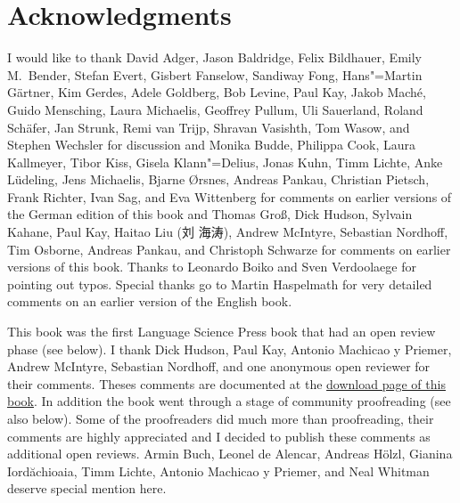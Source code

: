 \section*{Acknowledgments}

I would like to thank David Adger,
Jason Baldridge, 
Felix Bildhauer, 
Emily M.\ Bender,
Stefan Evert, 
Gisbert Fanselow, 
Sandiway Fong,
Hans"=Martin Gärtner,
Kim Gerdes,
Adele Goldberg,
Bob Levine,
Paul Kay,
Jakob Maché,
Guido Mensching,
Laura Michaelis,
Geoffrey Pullum, 
Uli Sauerland, 
Roland Schäfer,
Jan Strunk,
Remi van Trijp, 
Shravan Vasishth,
Tom Wasow, and
Stephen Wechsler
for discussion and 
%
Monika Budde, 
Philippa Cook,
Laura Kallmeyer, 
Tibor Kiss,
Gisela Klann"=Delius, 
Jonas Kuhn,
Timm Lichte, %
Anke Lüdeling,
Jens Michaelis,
Bjarne Ørsnes,
Andreas Pankau,     %
Christian Pietsch,
Frank Richter,
Ivan Sag, and
Eva Wittenberg
for comments on earlier versions of the German edition of this book and
%
%
Thomas Groß,
Dick Hudson,
Sylvain Kahane, 
Paul Kay,
Haitao Liu (刘 海涛),
Andrew McIntyre,
Sebastian Nordhoff,
Tim Osborne, 
Andreas Pankau, and
Christoph Schwarze
for comments on earlier versions of this book. Thanks to Leonardo Boiko and Sven Verdoolaege for pointing out typos.
Special thanks go to Martin Haspelmath for very detailed comments on an
earlier version of the English book. 

This book was the first Language Science Press book that had an open review phase (see below). I
thank Dick Hudson, Paul Kay, Antonio Machicao y Priemer, Andrew McIntyre, Sebastian Nordhoff, and one anonymous open
reviewer for their comments. Theses comments are documented at the \href{\lsURL}{download page of
  this book}. In addition the book went through a stage of community proofreading (see also
below). Some of the proofreaders did much more than proofreading, their comments are highly
appreciated and I decided to publish these comments as additional open reviews.
Armin Buch, 
Leonel de Alencar,
Andreas Hölzl,
Gianina Iordăchioaia,
Timm Lichte,
Antonio Machicao y Priemer, and
Neal Whitman
deserve special mention here.


